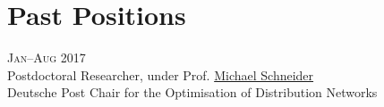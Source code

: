 \section*{Past Positions}

\begin{paracol}{2}
  \textsc{Jan--Aug 2017}
\switchcolumn
  \\
  Postdoctoral Researcher, under Prof. \href{http://www.dpor.rwth-aachen.de/}{Michael Schneider}\\
  Deutsche Post Chair for the Optimisation of Distribution Networks
\end{paracol}